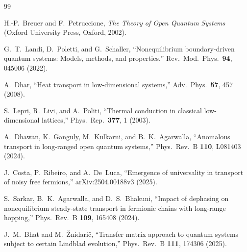 \documentclass[aps,prd,twocolumn,superscriptaddress,floatfix]{revtex4-2}
\begin{document}

\begin{thebibliography}{99}

H.-P.~Breuer and F.~Petruccione,
\textit{The Theory of Open Quantum Systems}
(Oxford University Press, Oxford, 2002).

G.~T.~Landi, D.~Poletti, and G.~Schaller,
``Nonequilibrium boundary-driven quantum systems: Models, methods, and
properties,''
Rev.\ Mod.\ Phys.\ \textbf{94}, 045006 (2022).

A.~Dhar,
``Heat transport in low-dimensional systems,''
Adv.\ Phys.\ \textbf{57}, 457 (2008).

S.~Lepri, R.~Livi, and A.~Politi,
``Thermal conduction in classical low-dimensional lattices,''
Phys.\ Rep.\ \textbf{377}, 1 (2003).

A.~Dhawan, K.~Ganguly, M.~Kulkarni, and B.~K.~Agarwalla,
``Anomalous transport in long-ranged open quantum systems,''
Phys.\ Rev.\ B \textbf{110}, L081403 (2024).

J.~Costa, P.~Ribeiro, and A.~De~Luca,
``Emergence of universality in transport of noisy free fermions,''
arXiv:2504.00188v3 (2025).

S.~Sarkar, B.~K.~Agarwalla, and D.~S.~Bhakuni,
``Impact of dephasing on nonequilibrium steady-state transport in
fermionic chains with long-range hopping,''
Phys.\ Rev.\ B \textbf{109}, 165408 (2024).

J.~M.~Bhat and M.~\v{Z}nidari\v{c},
``Transfer matrix approach to quantum systems subject to certain
Lindblad evolution,''
Phys.\ Rev.\ B \textbf{111}, 174306 (2025).

\end{thebibliography}
\end{document}
